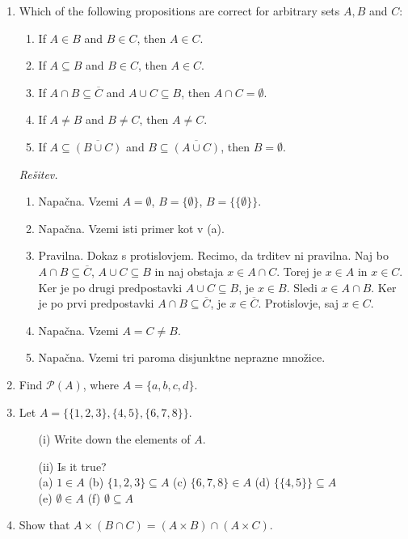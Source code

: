 \documentclass[11pt,paper=b5,footinclude,headinclude]{scrbook} %
\theoremstyle{remark}
\theoremstyle{definition} %
\theoremstyle{theorem} %
\begin{document}
\begin{enumerate}
\item Which of the following propositions are correct for arbitrary sets $A, B$ and $C$:
\begin{enumerate}
\item If $A\in B$ and $B\in C$, then $A\in C$.
\item If $A\subseteq B$ and $B\in C$, then $A\in C$.
\item If $A\cap B\subseteq \overline{C}$ and $A\cup C \subseteq B$, then $A\cap C = \emptyset$.
\item If $A\neq B$ and $B\neq C$, then $A\neq C$.
\item If $A\subseteq \overline{(B\cup C)}$ and $B\subseteq \overline{(A\cup C)}$, then $B=\emptyset$.
\end{enumerate}

\emph{ Rešitev.}
\begin{enumerate}
\item Napačna. Vzemi $A=\emptyset$, $B=\{\emptyset\}$, $B=\{\{\emptyset\}\}$.
\item Napačna. Vzemi isti primer kot v (a).
\item Pravilna. Dokaz s protislovjem. Recimo, da trditev ni pravilna. Naj bo $A\cap B\subseteq \overline{C}$, $A\cup C\subseteq B$  in naj obstaja $x\in A\cap C$. Torej je $x\in A$ in $x\in C$. Ker je po drugi predpostavki $A\cup C\subseteq B$, je $x\in B$. Sledi $x\in A \cap B$. Ker je po prvi predpostavki $A\cap B\subseteq \overline{C}$, je $x\in \overline{C}$. Protislovje, saj $x\in C$. 
\item Napačna. Vzemi $A=C\neq B$.
\item Napačna. Vzemi tri paroma disjunktne neprazne množice.
\end{enumerate}

\item Find $\mathcal{P}(A)$, where $A=\{a,b,c,d\}$.

\item Let $A=\{\{1,2,3\}, \{4,5\}, \{6,7,8\}\}$.
\begin{enumerate}
\item[(i)] Write down the elements of  $A$.
\item[(ii)] Is it true?\\
 (a) $1\in A$ \quad (b) $\{1,2,3\}\subseteq A$ \quad (c)  $\{6,7,8\}\in  A$ \quad  (d)  $\{\{4,5\}\}\subseteq A$\\
  (e) $\emptyset\in A$ \quad(f) $\emptyset\subseteq A$
\end{enumerate}


\item  Show that $A\times (B\cap C) = (A\times B)\cap (A\times C)$.




\end{enumerate}
\end{document}
